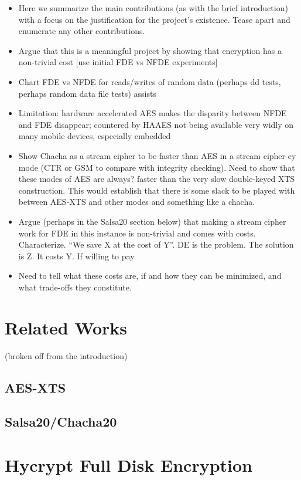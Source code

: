 \documentclass[letterpaper,twocolumn,10pt]{article}
\begin{document}
\begin{itemize}
  \item Here we summarize the main contributions (as with the brief introduction) with a focus on the justification for
  the project's existence. Tease apart and enumerate any other contributions.
  \item Argue that this is a meaningful project by showing that encryption has a non-trivial cost [use initial FDE vs
  NFDE experiments]
  \item Chart FDE vs NFDE for reads/writes of random data (perhaps dd tests, perhaps random data file tests) assists
  \item Limitation: hardware accelerated AES makes the disparity between NFDE and FDE disappear; countered by HAAES not being
  available very widly on many mobile devices, especially embedded
  \item Show Chacha as a stream cipher to be faster than AES in a stream cipher-ey mode (CTR or GSM to compare
  with integrity checking). Need to show that these modes of AES are always? faster than the very slow double-keyed XTS
  construction. This would establish that there is some slack to be played with between AES-XTS and other modes and something like a chacha.
  \item Argue (perhaps in the Salsa20 section below) that making a stream cipher work for FDE in this instance is non-trivial
  and comes with costs. Characterize. ``We save X at the cost of Y''. DE is the problem. The solution is Z. It costs Y. If willing to pay.
  \item Need to tell what these costs are, if and how they can be minimized, and what trade-offs they constitute.
\end{itemize}


\section{Related Works}
(broken off from the introduction)
\subsection{AES-XTS}
\subsection{Salsa20/Chacha20}

\section{Hycrypt Full Disk Encryption}
\end{document}
